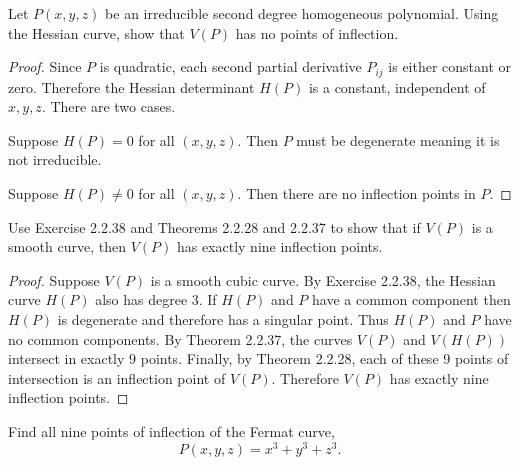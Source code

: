 \begin{tcolorbox}[title=Problem 36, breakable]
    Let $P(x, y, z)$ be an irreducible second degree homogeneous polynomial.
    Using the Hessian curve, show that $V(P)$ has no points of inflection.
\end{tcolorbox}

\begin{proof}
    Since $P$ is quadratic, each second partial derivative $P_{ij}$ is either constant or zero. 
    Therefore the Hessian determinant $H(P)$ is a constant, independent of $x, y, z$.
    There are two cases.

    Suppose $H(P) = 0$ for all $(x, y, z)$.
    Then $P$ must be degenerate meaning it is not irreducible.

    Suppose $H(P) \ne 0$ for all $(x, y, z)$. 
    Then there are no inflection points in $P$.
\end{proof}

\begin{tcolorbox}[title=Problem 38, breakable]
    Use Exercise 2.2.38 and Theorems 2.2.28 and 2.2.37 
    to show that if $V(P)$ is a smooth curve, then $V(P)$
    has exactly nine inflection points.
\end{tcolorbox}

\begin{proof}
    Suppose $V(P)$ is a smooth cubic curve.
    By Exercise 2.2.38, the Hessian curve $H(P)$ also has degree $3$.
    If $H(P)$ and $P$ have a common component then $H(P)$ is degenerate and therefore has a singular point.
    Thus $H(P)$ and $P$ have no common components.
    By Theorem 2.2.37, the curves $V(P)$ and $V(H(P))$ intersect in exactly $9$ points.
    Finally, by Theorem 2.2.28, each of these $9$ points of intersection is an inflection point of $V(P)$.
    Therefore $V(P)$ has exactly nine inflection points.
\end{proof}


\begin{tcolorbox}[title=Problem 39, breakable]
    Find all nine points of inflection of the Fermat curve,
    \[P(x, y, z) = x^3 + y^3 + z^3.\]
\end{tcolorbox}

